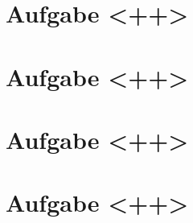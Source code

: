 




\newcommand{\nr}{<+num+>}


\section*{Aufgabe <++>}
\section*{Aufgabe <++>}
\section*{Aufgabe <++>}
\section*{Aufgabe <++>}


